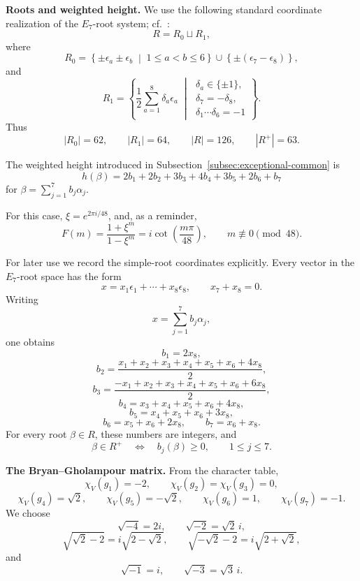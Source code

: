 \documentclass[a4paper,reqno]{amsart}
\theoremstyle{plain} %
\theoremstyle{definition} %
\theoremstyle{remark} %
\newcommand{\1}{\mathds{1}}   %
\begin{document}
\medskip

\noindent\textbf{Roots and weighted height.}
We use the following standard coordinate realization of the \(E_7\)-root
system; cf.~\cite{Humphreys}:
\[
R=R_0\sqcup R_1,
\]
where
\[
R_0
=
\left\{
\pm\epsilon_a\pm\epsilon_b
\;\middle|\;
1\le a<b\le6
\right\}
\cup
\left\{
\pm(\epsilon_7-\epsilon_8)
\right\},
\]
and
\[
R_1
=
\left\{
\frac12\sum_{a=1}^8\delta_a\epsilon_a
\;\middle|\;
\begin{array}{c}
\delta_a\in\{\pm1\},\\
\delta_7=-\delta_8,\\
\delta_1\cdots\delta_6=-1
\end{array}
\right\}.
\]
Thus
\[
|R_0|=62,
\qquad
|R_1|=64,
\qquad
|R|=126,
\qquad
|R^+|=63.
\]

The weighted height introduced in
Subsection~\ref{subsec:exceptional-common} is
\[
h(\beta)
=
2b_1+2b_2+3b_3+4b_4+3b_5+2b_6+b_7
\]
for $\beta=\sum_{j=1}^7b_j\alpha_j$. 


For this case, $\xi=e^{2\pi i/48}$,
 and, as a reminder,
\[
F(m)
=
\frac{1+\xi^m}{1-\xi^m}
=
i\cot\left(\frac{m\pi}{48}\right),
\qquad
m\not\equiv0\pmod{48}.
\]

For later use we record the simple-root coordinates explicitly.
Every vector in the \(E_7\)-root space has the form
\[
x=x_1\epsilon_1+\cdots+x_8\epsilon_8,
\qquad
x_7+x_8=0.
\]
Writing
\[
x=\sum_{j=1}^7b_j\alpha_j,
\]
one obtains
\[
b_1=2x_8,
\]
\[
b_2
=
\frac{
x_1+x_2+x_3+x_4+x_5+x_6+4x_8
}{2},
\]
\[
b_3
=
\frac{
-x_1+x_2+x_3+x_4+x_5+x_6+6x_8
}{2},
\]
\[
b_4=x_3+x_4+x_5+x_6+4x_8,
\]
\[
b_5=x_4+x_5+x_6+3x_8,
\]
\[
b_6=x_5+x_6+2x_8,
\qquad
b_7=x_6+x_8.
\]
For every root \(\beta\in R\), these numbers are integers, and
\[
\beta\in R^+
\quad\Longleftrightarrow\quad
b_j(\beta)\ge0,
\qquad
1\le j\le7.
\]

\medskip

\noindent\textbf{The Bryan--Gholampour matrix.}
From the character table,
\[
\chi_V(g_1)=-2,
\qquad
\chi_V(g_2)=\chi_V(g_3)=0,
\]
\[
\chi_V(g_4)=\sqrt2,
\qquad
\chi_V(g_5)=-\sqrt2,
\qquad
\chi_V(g_6)=1,
\qquad
\chi_V(g_7)=-1.
\]
We choose
\[
\sqrt{-4}=2i,
\qquad
\sqrt{-2}=\sqrt2\,i,
\]
\[
\sqrt{\sqrt2-2}
=
i\sqrt{2-\sqrt2},
\qquad
\sqrt{-\sqrt2-2}
=
i\sqrt{2+\sqrt2},
\]
and
\[
\sqrt{-1}=i,
\qquad
\sqrt{-3}=\sqrt3\,i.
\]
\end{document}
